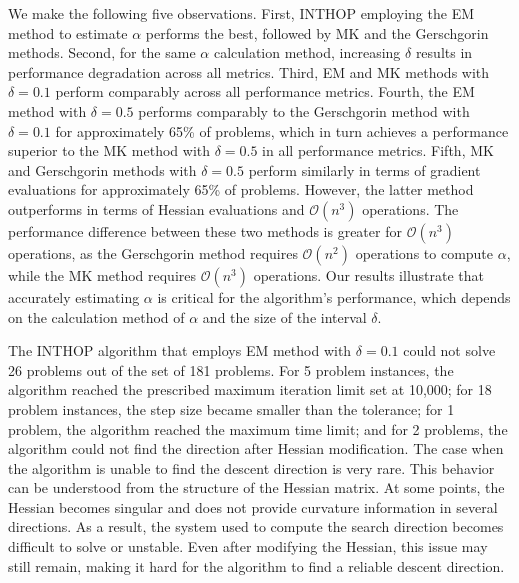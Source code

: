 \documentclass{elsarticle}
\numberwithin{equation}{section}
\begin{document}
{We make the following five observations. First, INTHOP employing the EM method to estimate $\alpha$ performs the best, followed by MK and the Gerschgorin methods. Second, for the same $\alpha$ calculation method, increasing $\delta$ results in performance degradation across all metrics. Third, EM and MK methods with $\delta=0.1$ perform comparably across all performance metrics. Fourth, the EM method with $\delta=0.5$ performs comparably to the Gerschgorin method with $\delta=0.1$ for approximately 65\% of problems, which in turn achieves a performance superior to the MK method with $\delta=0.5$ in all performance metrics. Fifth, MK and Gerschgorin methods with  $\delta=0.5$ perform similarly in terms of gradient evaluations for approximately 65\% of problems.} However, the latter method outperforms in terms of Hessian evaluations and $\mathcal{O}(n^3)$ operations. The performance difference between these two methods is greater for $\mathcal{O}(n^3)$ operations, as the Gerschgorin method requires $\mathcal{O}(n^2)$ operations to compute $\alpha$, while the MK method requires $\mathcal{O}(n^3)$ operations. Our results illustrate that accurately estimating $\alpha$ is critical for the algorithm's performance, which depends on the calculation method of $\alpha$ and the size of the interval $\delta$.

{The INTHOP algorithm that employs EM method with $\delta=0.1$ could not solve 26 problems out of the set of 181 problems. For 5 problem instances, the algorithm reached the prescribed maximum iteration limit set at 10,000; for 18 problem instances, the step size became smaller than the tolerance; for 1 problem, the algorithm reached the maximum time limit; and for 2 problems, the algorithm could not find the direction after Hessian modification. The case when the algorithm is unable to find the descent direction is very rare. This behavior can be understood from the structure of the Hessian matrix. At some points, the Hessian becomes singular and does not provide curvature information in several directions. As a result, the system used to compute the search direction becomes difficult to solve or unstable. Even after modifying the Hessian, this issue may still remain, making it hard for the algorithm to find a reliable descent direction. }  
  
\end{document}
